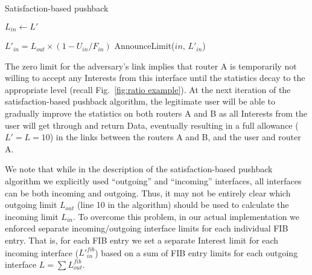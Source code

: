 { 
\begin{algorithm}[h]
\footnotesize
\caption{\small Satisfaction-based pushback}
\label{alg:dynamic limits}
\begin{algorithmic}[1]
\State{} 
\vspace{0.1cm}
  

\vspace{0.1cm}

\State{} 
    \State $L_{in} \leftarrow L'$
\EndFunction

\vspace{0.1cm}

 

        \State $L'_{in}= {L_{out}} \times (1 - U_{in}/F_{in})$
        \State AnnounceLimit($in$, $L'_{in}$)
   \EndFor

\EndFor
\EndFunction

\end{algorithmic}
\end{algorithm}


The zero limit for the adversary's link implies that  router A is temporarily not willing to accept any Interests from this interface until the statistics decay to the appropriate level (recall Fig.~\ref{fig:ratio example}).
At the next iteration of the satisfaction-based pushback algorithm, the legitimate user will be able to gradually improve the statistics on both routers A and B as all Interests from the user will get through and return Data, eventually resulting in a full allowance ($L'=L=10$) in the links between the routers A and B, and the user and router A.

We note that while in the description of the satisfaction-based pushback algorithm we explicitly used ``outgoing'' and ``incoming'' interfaces,  all interfaces can be both incoming and outgoing.
Thus, it may not be entirely clear which outgoing limit $L_{out}$ (line 10 in the algorithm) should be used to calculate the incoming limit $L_{in}$.
To overcome this problem, in our actual implementation we enforced separate incoming/outgoing interface limits for each individual FIB entry.
That is, for each FIB entry we set a separate Interest limit for each incoming interface (${L'}_{in}^{fib}$) based on a sum of FIB entry limits for each outgoing interface $L=\sum{L_{out}^{fib}}$.


}
